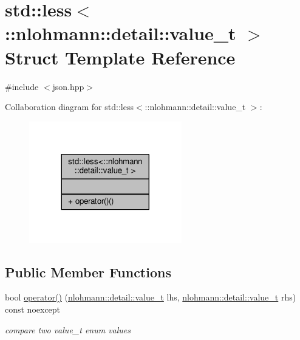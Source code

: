 \hypertarget{structstd_1_1less_3_1_1nlohmann_1_1detail_1_1value__t_01_4}{}\section{std\+:\+:less$<$\+:\+:nlohmann\+:\+:detail\+:\+:value\+\_\+t $>$ Struct Template Reference}
\label{structstd_1_1less_3_1_1nlohmann_1_1detail_1_1value__t_01_4}


{\ttfamily \#include $<$json.\+hpp$>$}



Collaboration diagram for std\+:\+:less$<$\+:\+:nlohmann\+:\+:detail\+:\+:value\+\_\+t $>$\+:
\nopagebreak
\begin{figure}[H]
\begin{center}
\leavevmode
\includegraphics[width=188pt]{structstd_1_1less_3_1_1nlohmann_1_1detail_1_1value__t_01_4__coll__graph}
\end{center}
\end{figure}
\subsection*{Public Member Functions}
\begin{DoxyCompactItemize}
\item 
bool \hyperlink{structstd_1_1less_3_1_1nlohmann_1_1detail_1_1value__t_01_4_a10d3fea50edf7b15ead8f4ceeb006000}{operator()} (\hyperlink{namespacenlohmann_1_1detail_a1ed8fc6239da25abcaf681d30ace4985}{nlohmann\+::detail\+::value\+\_\+t} lhs, \hyperlink{namespacenlohmann_1_1detail_a1ed8fc6239da25abcaf681d30ace4985}{nlohmann\+::detail\+::value\+\_\+t} rhs) const noexcept
\begin{DoxyCompactList}\small\item\em compare two value\+\_\+t enum values \end{DoxyCompactList}\end{DoxyCompactItemize}


